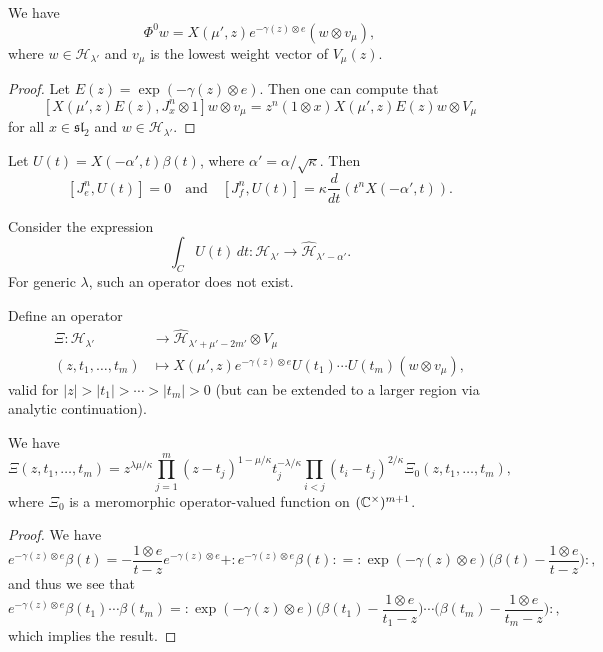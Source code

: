 \begin{lemma}
  We have
  \[
    \Phi^0 w
    = X(\mu', z) e^{-\gamma(z) \otimes e}
    (w \otimes v_\mu),
  \]
  where $w \in \mathcal{H}_{\lambda'}$
  and $v_\mu$ is the lowest weight vector
  of $V_\mu(z)$.
\end{lemma}

\begin{proof}
  Let $E(z) = \exp(-\gamma(z) \otimes e)$. Then
  one can compute that
  \[
    [X(\mu', z) E(z), J_x^n \otimes 1]
    w \otimes v_\mu
    = z^n(1 \otimes x) X(\mu', z) E(z)
    w \otimes V_\mu
  \]
  for all $x \in \mathfrak{sl}_2$ and $w \in \mathcal{H}_{\lambda'}$.
\end{proof}

\begin{lemma}
  Let $U(t) = X(-\alpha', t) \beta(t)$,
  where $\alpha' = \alpha / \sqrt{\kappa}$.
  Then
  \[
    [J^n_e, U(t)] = 0 \quad \text{and} \quad
    [J_f^n, U(t)]
    = \kappa \frac{d}{dt}(t^n X(-\alpha', t)).
  \]
\end{lemma}

\begin{remark}
  Consider the expression
  \[
    \int_C U(t)\, dt
    : \mathcal{H}_{\lambda'}
    \longrightarrow
    \widehat{\mathcal{H}}_{\lambda' - \alpha'}.
  \]
  For generic $\lambda$, such an operator
  does not exist.
\end{remark}

\begin{remark}
  Define an operator
  \begin{align*}
    \Xi : \mathcal{H}_{\lambda'}
    &\longrightarrow
    \widehat{\mathcal{H}}_{\lambda' + \mu' - 2m'}
    \otimes V_\mu \\
    (z, t_1, \dots, t_m)
    &\longmapsto
    X(\mu', z) e^{-\gamma(z) \otimes e}
    U(t_1) \cdots U(t_m) (w \otimes v_\mu),
  \end{align*}
  valid for
  $|z| > |t_1| > \cdots > |t_m| > 0$
  (but can be extended to a larger region
  via analytic continuation).
\end{remark}

\begin{prop}
  We have
  \[
    \Xi(z, t_1, \dots, t_m)
    =
    z^{\lambda \mu / \kappa}
    \prod_{j = 1}^m
    (z - t_j)^{1 - \mu / \kappa}
    t_j^{-\lambda / \kappa}
    \prod_{i < j} (t_i - t_j)^{2 / \kappa}
    \Xi_0(z, t_1, \dots, t_m),
  \]
  where $\Xi_0$ is a meromorphic operator-valued
  function on
  $(\mathbb{C}^\times)^{m + 1}$.
\end{prop}

\begin{proof}
  We have
  \[
    e^{-\gamma(z) \otimes e}
    \beta(t)
    = - \frac{1 \otimes e}{t - z} e^{-\gamma(z) \otimes e}
    + {:} e^{-\gamma(z) \otimes e} \beta(t) {:}
    = {:} \exp(-\gamma(z) \otimes e)
    \bigg(
      \beta(t) - \frac{1 \otimes e}{t - z}
    \bigg){:},
  \]
  and thus we see that
  \[
    e^{-\gamma(z) \otimes e}
    \beta(t_1) \cdots \beta(t_m)
    = {:}\exp(-\gamma(z) \otimes e)
    \bigg(
      \beta(t_1) - \frac{1 \otimes e}{t_1 - z}
    \bigg) \cdots
    \bigg(
      \beta(t_m) - \frac{1 \otimes e}{t_m - z}
    \bigg){:},
  \]
  which implies the result.
\end{proof}
